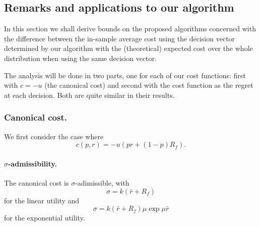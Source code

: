 \subsection{Remarks and applications to our algorithm}

In this section we shall derive bounds on the proposed algorithms concerned with the
difference between the in-sample average cost using the decision vector determined by our
algorithm with the (theoretical) expected cost over the whole distribution when using the
same decision vector. 

The analysis will be done in two parts, one for each of our cost functions: first with
$c=-u$ (the canonical cost) and second with the cost function as the regret at each
decision. Both are quite similar in their results. 

\subsubsection{Canonical cost.}
We first consider the case where 
\begin{equation*}
  c(p,r) = -u(pr + (1-p)R_f).
\end{equation*}

\paragraph{$\sigma$-admissibility.}  The canonical cost is $\sigma$-adimissible, with 
\begin{equation}
  \label{linearSigmaAdmissibility}
  \sigma = k(\bar r+R_f)
\end{equation}
for the linear utility and 
\begin{equation}
  \label{expSigmaAdmissibility}
  \sigma = k (\bar r+ R_f) \mu\exp\mu\bar r
\end{equation}
for the exponential utility.

